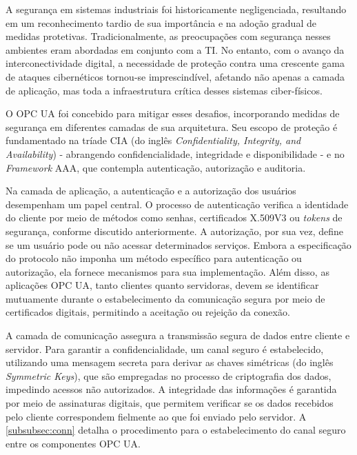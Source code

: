         A segurança em sistemas industriais foi historicamente negligenciada, resultando em um reconhecimento tardio de sua importância e na adoção gradual de medidas protetivas. Tradicionalmente, as preocupações com segurança nesses ambientes eram abordadas em conjunto com a TI. No entanto, com o avanço da interconectividade digital, a necessidade de proteção contra uma crescente gama de ataques cibernéticos tornou-se imprescindível, afetando não apenas a camada de aplicação, mas toda a infraestrutura crítica desses sistemas ciber-físicos.

        O OPC UA foi concebido para mitigar esses desafios, incorporando medidas de segurança em diferentes camadas de sua arquitetura. Seu escopo de proteção é fundamentado na tríade CIA (do inglês \textit{Confidentiality, Integrity, and Availability}) - abrangendo confidencialidade, integridade e disponibilidade - e no \textit{Framework} AAA, que contempla autenticação, autorização e auditoria.
        
        Na camada de aplicação, a autenticação e a autorização dos usuários desempenham um papel central. O processo de autenticação verifica a identidade do cliente por meio de métodos como senhas, certificados X.509V3 ou \textit{tokens} de segurança, conforme discutido anteriormente. A autorização, por sua vez, define se um usuário pode ou não acessar determinados serviços. Embora a especificação do protocolo não imponha um método específico para autenticação ou autorização, ela fornece mecanismos para sua implementação. Além disso, as aplicações OPC UA, tanto clientes quanto servidoras, devem se identificar mutuamente durante o estabelecimento da comunicação segura por meio de certificados digitais, permitindo a aceitação ou rejeição da conexão.
        
        A camada de comunicação assegura a transmissão segura de dados entre cliente e servidor. Para garantir a confidencialidade, um canal seguro é estabelecido, utilizando uma mensagem secreta para derivar as chaves simétricas (do inglês \textit{Symmetric Keys}), que são empregadas no processo de criptografia dos dados, impedindo acessos não autorizados. A integridade das informações é garantida por meio de assinaturas digitais, que permitem verificar se os dados recebidos pelo cliente correspondem fielmente ao que foi enviado pelo servidor. A \autoref{subsubsec:conn} detalha o procedimento para o estabelecimento do canal seguro entre os componentes OPC UA.


